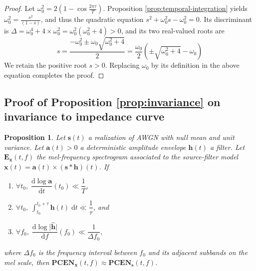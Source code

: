 \documentclass[journal]{IEEEtran}
\newtheorem*{prop*}{Proposition}
\theoremstyle{remark}
\begin{document}
\begin{proof}
Let $\omega_0^2 = 2 \left(1 - \cos \frac{2\pi \tau}{T}\right)$.
Proposition \ref{prop:temporal-integration} yields
$\omega_0^2 = \frac{s^2}{(1-s)}$, and thus the quadratic equation
$s^2 + \omega_0^2 s - \omega_0^2 = 0$.
Its discriminant is $\Delta = \omega_0^4 + 4 \times \omega_0^2 = \omega_0^2 (\omega_0^2 + 4) > 0$, and its two real-valued roots are
\begin{equation}
s = \frac{- \omega_0^2 \pm \omega_0 \sqrt{\omega_0^2 +4}}{2}
= \frac{\omega_0}{2} \left(\pm\sqrt{\omega_0^2 + 4} - \omega_0\right)
\end{equation}
We retain the positive root $s > 0$. Replacing $\omega_0$ by its definition in the above equation completes the proof.
\end{proof}


\subsection{Proof of Proposition \ref{prop:invariance} on invariance to impedance curve}

\begin{prop*}
Let $\mathbf{s}(t)$ a realization of AWGN with null mean and unit variance.
Let $\mathbf{a}(t) > 0$ a deterministic amplitude envelope $\mathbf{h}(t)$ a filter.
Let $\mathbf{E}_\mathbf{x}(t,f)$ the mel-frequency spectrogram associated to the source-filter model $\mathbf{x}(t) = \mathbf{a}(t) \times (\mathbf{s}\ast\mathbf{h})(t)$.
If
\begin{enumerate}
\item $\forall t_0,\; \dfrac{\mathrm{d}\log \mathbf{a}}{\mathrm{d}t} (t_0) \ll \dfrac{1}{T}$,
\item $\forall t_0,\; \int_{t_0}^{t_0+\tau} \mathbf{h}(t)\;\mathrm{d}t \ll \dfrac{1}{\tau}$, and
\item $\forall f_0,\; \dfrac{\mathrm{d}\log \vert \widehat{\mathbf{h}}\vert}{\mathrm{d}f}(f_0) \ll
\dfrac{1}{\Delta f_0},
$
\end{enumerate}
where $\Delta f_0$ is the frequency interval between $f_0$ and its adjacent subbands on the mel scale,
then $\mathbf{PCEN_x}(t,f) \approx \mathbf{PCEN_s}(t,f)$.
\end{prop*}

\renewenvironment{proof}{\emph{Proof.}}{\qed}
\end{document}

